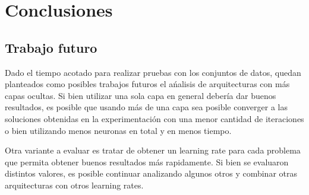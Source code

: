 \documentclass[informe.tex]{subfiles}
\begin{document}
  
  \section{Conclusiones}
  
  
    \subsection{Trabajo futuro}
    
      Dado el tiempo acotado para realizar pruebas con los conjuntos de datos, quedan planteados como posibles trabajos futuros el ańalisis de arquitecturas con más capas ocultas. Si bien utilizar una sola capa en general debería dar buenos resultados, es posible que usando más de una capa sea posible converger a las soluciones obtenidas en la experimentación con una menor cantidad de iteraciones o bien utilizando menos neuronas en total y en menos tiempo.
      
      Otra variante a evaluar es tratar de obtener un learning rate para cada problema que permita obtener buenos resultados m\'as r\´apidamente. Si bien se evaluaron distintos valores, es posible continuar analizando algunos otros y combinar otras arquitecturas con otros learning rates.
\end{document}
